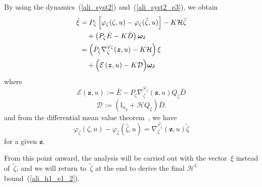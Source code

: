 \documentclass{ifacconf}
\def\eqref#1{(\ref{#1})}
\begin{document}
By using the dynamics~\eqref{ali_syst2} and~\eqref{ali_syst2_e3}, we obtain
\begin{align}\label{ali_syst2_e6}
\dot{\xi} &= P_{\zeta} \left[ \varphi_{\zeta}(\zeta,u) - \varphi_{\zeta}(\hat{\zeta},u) \right] -K \mathcal{H} \tilde{\zeta} \notag \\
&\quad + \left(P_{\zeta} \bar{E} - K \bar{D} \right) \bm{\omega}_{\delta} \notag \\
&= \left(P_{\zeta} \nabla^{\varphi_{\zeta}}_{\zeta}(\bm{z},u) - K  \mathcal{H} \right) \xi \notag \\
&\quad+ \Big( \mathcal{E}\left( \bm{z},u\right) - K  \mathcal{D} \Big) \bm{\omega}_{\delta}
\end{align}
where
$$
\mathcal{E}\left( \bm{z},u\right) := \bar{E} - P_{\zeta} \nabla^{\varphi_{\zeta}}_{\zeta}(\bm{z},u) Q_{\zeta} \bar{D}
$$
$$
\mathcal{D} := \left( \mathbb{I}_{n_y} + \mathcal{H} Q_{\zeta} \right) \bar{D}.
$$
and from the differential mean value theorem~\citep{Hasni_LCSS_24}, we have
$$
\varphi_{\zeta}\left(\zeta,u \right) - \varphi_{\zeta}\left(\hat{\zeta},u \right) = \nabla^{\varphi_{\zeta}}_{\zeta}(\bm{z},u) \tilde{\zeta}
$$
for a given $\bm{z}$.

From this point onward, the analysis will be carried out with the vector~$\xi$ instead of~$\tilde{\zeta}$, and we will return to~$\tilde{\zeta}$ at the end to derive the final $\mathcal{H}^{1}$ bound~\eqref{ali_h1_e1_2}.

\vspace*{-0.1cm}
\end{document}
